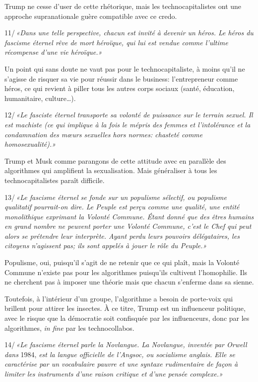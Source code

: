 \documentclass[a5paper, 10pt, twoside]{book}
\begin{document}
Trump ne cesse d’user de cette rhétorique, mais les technocapitalistes
ont une approche supranationale guère compatible avec ce credo.

11/\,\emph{«Dans une telle perspective, chacun est invité à devenir un
héros. Le héros du fascisme éternel rêve de mort héroïque, qui lui est
vendue comme l’ultime récompense d’une vie héroïque.»}

Un point qui sans doute ne vaut pas pour le technocapitaliste, à moins
qu’il ne s’agisse de risquer sa vie pour réussir dans le business:
l’entrepreneur comme héros, ce qui revient à piller tous les autres
corps sociaux (santé, éducation, humanitaire, culture…).

12/\,\emph{«Le fasciste éternel transporte sa volonté de puissance sur
le terrain sexuel. Il est machiste (ce qui implique à la fois le mépris
des femmes et l’intolérance et la condamnation des mœurs sexuelles hors
normes: chasteté comme homosexualité).»}

Trump et Musk comme parangons de cette attitude avec en parallèle des
algorithmes qui amplifient la sexualisation. Mais généraliser à tous les
technocapitalistes paraît difficile.

13/\,\emph{«Le fascisme éternel se fonde sur un populisme sélectif, ou
populisme qualitatif pourrait-on dire. Le Peuple est perçu comme une
qualité, une entité monolithique exprimant la Volonté Commune. Étant
donné que des êtres humains en grand nombre ne peuvent porter une
Volonté Commune, c’est le Chef qui peut alors se prétendre leur
interprète. Ayant perdu leurs pouvoirs délégataires, les citoyens
n’agissent pas; ils sont appelés à jouer le rôle du Peuple.»}

Populisme, oui, puisqu’il s’agit de ne retenir que ce qui plaît, mais la
Volonté Commune n’existe pas pour les algorithmes puisqu’ils cultivent
l’homophilie. Ils ne cherchent pas à imposer une théorie mais que chacun
s’enferme dans sa sienne.

Toutefois, à l’intérieur d’un groupe, l’algorithme a besoin de
porte-voix qui brillent pour attirer les insectes. À ce titre, Trump est
un influenceur politique, avec le risque que la démocratie soit
confisquée par les influenceurs, donc par les algorithmes, \emph{in
fine} par les technocollabos.

14/\,\emph{«Le fascisme éternel parle la Novlangue. La Novlangue,
inventée par Orwell dans} 1984, \emph{est la langue officielle de
l’Angsoc, ou socialisme anglais. Elle se caractérise par un vocabulaire
pauvre et une syntaxe rudimentaire de façon à limiter les instruments
d’une raison critique et d’une pensée complexe.»}
\end{document}
